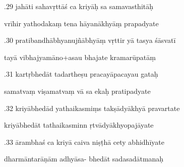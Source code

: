 \documentclass[article,12pt,a4paper]{memoir}%
\newcounter{parCount}
\begin{document}
	  
	  \pstart {}.29 jahāti sahavṛttāś ca kriyāḥ sa samavasthitāḥ 
	{}
	\pend%
      

	  
	  \pstart \leavevmode%
	vrīhir yathodakaṃ tena hāyanākhyāṃ prapadyate 
	{}
	\pend%
      

	  
	  \pstart {}.30 pratibandhābhyanujñābhyāṃ vṛttir yā tasya śāsvatī 
	{}
	\pend%
      

	  
	  \pstart \leavevmode%
	tayā vibhajyamāno+asau bhajate kramarūpatāṃ 
	{}
	\pend%
      

	  
	  \pstart {}.31 kartṛbhedāt tadartheṣu pracayāpacayau gataḥ 
	{}
	\pend%
      

	  
	  \pstart \leavevmode%
	samatvaṃ viṣamatvaṃ vā sa ekaḥ pratipadyate 
	{}
	\pend%
      

	  
	  \pstart {}.32 kriyābhedād yathaikasmiṃs takṣādyākhyā pravartate 
	{}
	\pend%
      

	  
	  \pstart \leavevmode%
	kriyābhedāt tathaikasminn ṛtvādyākhyopajāyate 
	{}
	\pend%
      

	  
	  \pstart {}.33 ārambhaś ca kriyā caiva niṣṭhā cety abhidhīyate 
	{}
	\pend%
      

	  
	  \pstart \leavevmode%
	dharmāntarāṇām adhyāsa- bhedāt sadasadātmanaḥ 
	{}
	\pend%
      
\end{document}
